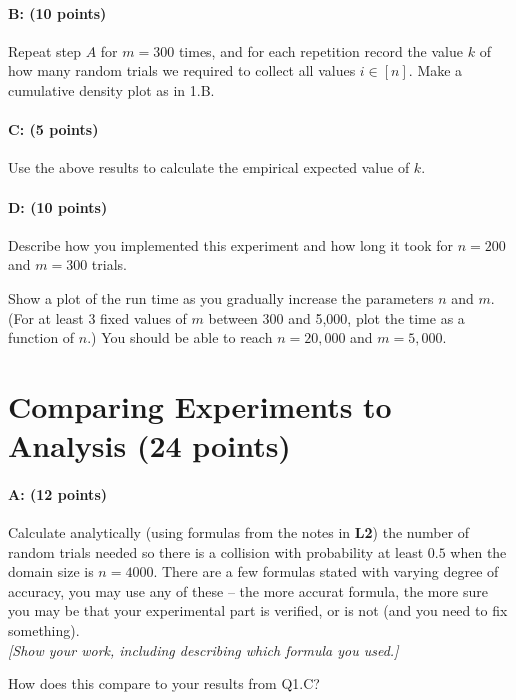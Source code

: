 \documentclass[11pt]{article}
\begin{document}
\paragraph{B: (10 points)}
Repeat step $A$ for $m=300$ times, and for each repetition record the value $k$ of how many random trials we required to collect all values $i \in [n]$.  
Make a cumulative density plot as in 1.B.  

\paragraph{C: (5 points)}
Use the above results to calculate the empirical expected value of $k$.

\paragraph{D: (10 points)} 
Describe how you implemented this experiment and how long it took for $n=200$ and $m=300$ trials.  

Show a plot of the run time as you gradually increase the parameters $n$ and $m$.  
(For at least 3 fixed values of $m$ between 300 and 5,000, plot the time as a function of $n$.)
You should be able to reach $n = 20{,}000$ and $m = 5{,}000$.  

\section{Comparing Experiments to Analysis (24 points)}

\paragraph{A: (12 points)}
Calculate analytically (using formulas from the notes in \textbf{L2}) the number of random trials needed so there is a collision with probability at least $0.5$ when the domain size is $n = 4000$.  There are a few formulas stated with varying degree of accuracy, you may use any of these -- the more accurat formula, the more sure you may be that your experimental part is verified, or is not (and you need to fix something).  
\\ \emph{[Show your work, including describing which formula you used.]}

How does this compare to your results from \textsf{Q1.C}?  
\end{document}
